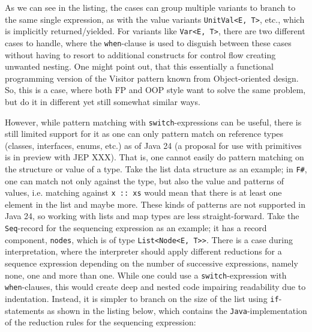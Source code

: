 As we can see in the listing, the cases can group multiple variants to branch to the same single expression, as with
the value variants \texttt{UnitVal<E, T>}, etc., which is implicitly returned/yielded. For variants like \texttt{Var<E, T>}, there are
two different cases to handle, where the \texttt{when}-clause is used to disguish between these cases without having to resort to
additional constructs for control flow creating unwanted nesting. One might point out, that this essentially a functional programming
version of the Visitor pattern known from Object-oriented design. So, this is a case, where both FP and OOP style want to solve the
same problem, but do it in different yet still somewhat similar ways.

However, while pattern matching with \texttt{switch}-expressions can be useful, there is still limited support for it as one
can only pattern match on reference types (classes, interfaces, enums, etc.) as of Java 24 (a proposal for use with primitives is in preview with JEP XXX).
That is, one cannot easily do pattern matching on the structure or value of a type. Take the list data structure as an example;
in \texttt{F\#}, one can match not only against the type, but also the value and patterns of values, i.e. matching against \texttt{x :: xs}
would mean that there is at least one element in the list and maybe more. These kinds of patterns are not supported in Java 24, so working with lists and
map types are less straight-forward. Take the \texttt{Seq}-record for the sequencing expression as an example; it has a record component,
\texttt{nodes}, which is of type \texttt{List<Node<E, T>>}. There is a case during interpretation, where the interpreter should apply
different reductions for a sequence expression depending on the number of successive expressions, namely none, one and more than one.
While one could use a \texttt{switch}-expression with \texttt{when}-clauses, this would create deep and nested code impairing readability
due to indentation. Instead, it is simpler to branch on the size of the list using \texttt{if}-statements as shown in the listing below, which
contains the \texttt{Java}-implementation of the reduction rules for the sequencing expression:


